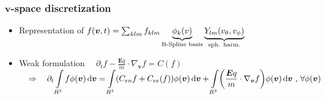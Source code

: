 \documentclass[mathserif, aspectratio=169]{beamer}
\newcommand{\ud}{\,\mathrm{d}}
\newcommand{\vect}[1]{\boldsymbol{#1}}
\newcommand{\of}[1]{\mleft( #1 \mright)}
\newcommand{\myint}{\int\limits}
\newcommand{\diff}[1]{\, d#1}
\begin{document}
\begin{frame}
	\frametitle{$\vect{v}$-space discretization}
	\small
	\begin{itemize}
		\item Representation of $f\of{\vect{v},t} = \sum_{klm} f_{klm} \underbrace{\phi_k\of{v}}_{\text{B-Spline basis}} \underbrace{Y_{lm}\of{v_\theta, v_\phi}}_{\tiny\text{sph. harm.}}$ 
		\item Weak formulation
			$
			\displaystyle
			\quad
			\partial_t f - \frac{\vect{E} q}{m} \cdot \nabla_{\vect{v}}f = C(f)
			\quad $ \\
			$
			\displaystyle
			\quad
			\Rightarrow \quad
			\partial_t \myint_{R^3} f \phi\of{\vect{v}} \ud \vect{v} = 
			\myint_{R^3} \of{C_{en}f + C_{ee}(f)} \phi\of{\vect{v}} \ud \vect{v} + \myint_{R^3} \of{\frac{\vect{E} q}{m} \cdot \nabla_{\vect{v}} f} \phi(\vect{v}) \ud \vect{v}\text{ , } 
			\forall \phi(\vect{v})$
	\end{itemize}
\end{frame}
\end{document}
